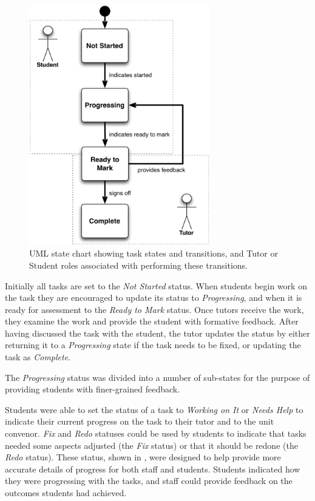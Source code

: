 \begin{figure}[thbp]
  \centering
  \includegraphics[width=0.7\textwidth]{BasicProcessStateChart}
  \caption{UML state chart showing task states and transitions, and Tutor or Student roles associated with performing these transitions.}
  \label{fig:basic_process_chart}
\end{figure}

Initially all tasks are set to the \emph{Not Started} status. When students begin work on the task they are encouraged to update its status to \emph{Progressing}, and when it is ready for assessment to the \emph{Ready to Mark} status. Once tutors receive the work, they examine the work and provide the student with formative feedback. After having discussed the task with the student, the tutor updates the status by either returning it to a \emph{Progressing} state if the task needs to be fixed, or updating the task as \emph{Complete}.

The \emph{Progressing} status was divided into a number of sub-states for the purpose of providing students with finer-grained feedback. 

Students were able to set the status of a task to \emph{Working on It} or \emph{Needs Help} to indicate their current progress on the task to their tutor and to the unit convenor. \emph{Fix} and \emph{Redo} statuses could be used by students to indicate that tasks needed some aspects adjusted (the \emph{Fix} status) or that it should be redone (the \emph{Redo} status). These status, shown in , were designed to help provide more accurate details of progress for both staff and students. Students indicated how they were progressing with the tasks, and staff could provide feedback on the outcomes students had achieved.

